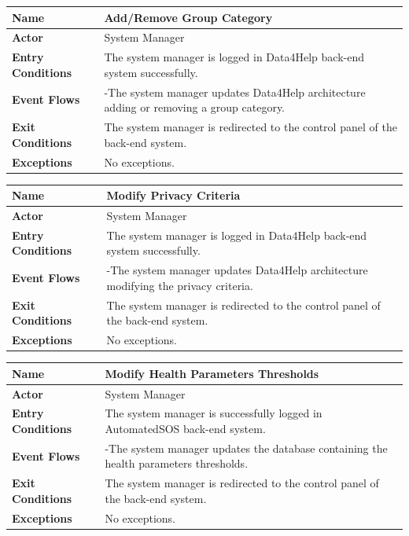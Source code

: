 \begin{center}
\begin{tabular}{|>{\bfseries} l |  p{8cm} |} \hline
    Name & {Add/Remove Group Category} \\ \hline
    Actor & {System Manager} \\ \hline
    Entry Conditions & {
    The system manager is logged in Data4Help back-end system successfully.} \\ \hline
    Event Flows & {
    -The system manager updates Data4Help architecture adding or removing a group category.} \\ \hline
    Exit Conditions & {The system manager is redirected to the control panel of the back-end system.} \\ \hline
    Exceptions & {
    No exceptions.} \\ \hline
\end{tabular}
\end{center}

\begin{center}
\begin{tabular}{|>{\bfseries} l |  p{8cm} |} \hline
    Name & {Modify Privacy Criteria} \\ \hline
    Actor & {System Manager} \\ \hline
    Entry Conditions & {
    The system manager is logged in Data4Help back-end system successfully.} \\ \hline
    Event Flows & {-The system manager updates Data4Help architecture modifying the privacy criteria.} \\ \hline
    Exit Conditions & {The system manager is redirected to the control panel of the back-end system.} \\ \hline
    Exceptions & {
    No exceptions.} \\ \hline
\end{tabular}
\end{center}

\begin{center}
\begin{tabular}{|>{\bfseries} l |  p{8cm} |} \hline
    Name & {Modify Health Parameters Thresholds} \\ \hline
    Actor & {System Manager} \\ \hline
    Entry Conditions & {
    The system manager is successfully logged in AutomatedSOS back-end system.} \\ \hline
    Event Flows & {
    -The system manager updates the database containing the health parameters thresholds.} \\ \hline
    Exit Conditions & {The system manager is redirected to the control panel of the back-end system.} \\ \hline
    Exceptions & {
    No exceptions.} \\ \hline
\end{tabular}
\end{center}
\clearpage


